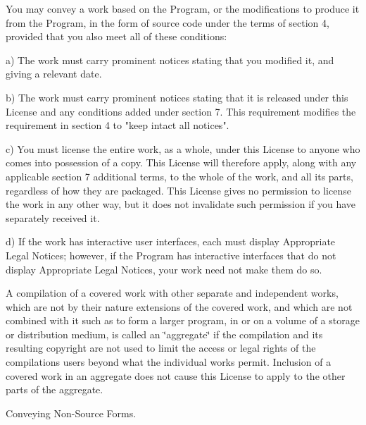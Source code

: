 You may convey a work based on the Program, or the modifications to produce it from the Program, in the form of source code under the terms of section 4, provided that you also meet all of these conditions\+: \begin{DoxyVerb}a) The work must carry prominent notices stating that you modified
it, and giving a relevant date.

b) The work must carry prominent notices stating that it is
released under this License and any conditions added under section
7.  This requirement modifies the requirement in section 4 to
"keep intact all notices".

c) You must license the entire work, as a whole, under this
License to anyone who comes into possession of a copy.  This
License will therefore apply, along with any applicable section 7
additional terms, to the whole of the work, and all its parts,
regardless of how they are packaged.  This License gives no
permission to license the work in any other way, but it does not
invalidate such permission if you have separately received it.

d) If the work has interactive user interfaces, each must display
Appropriate Legal Notices; however, if the Program has interactive
interfaces that do not display Appropriate Legal Notices, your
work need not make them do so.
\end{DoxyVerb}


A compilation of a covered work with other separate and independent works, which are not by their nature extensions of the covered work, and which are not combined with it such as to form a larger program, in or on a volume of a storage or distribution medium, is called an \char`\"{}aggregate\char`\"{} if the compilation and its resulting copyright are not used to limit the access or legal rights of the compilation\textquotesingle{}s users beyond what the individual works permit. Inclusion of a covered work in an aggregate does not cause this License to apply to the other parts of the aggregate.


\begin{DoxyEnumerate}
\item Conveying Non-\/\+Source Forms.
\end{DoxyEnumerate}

